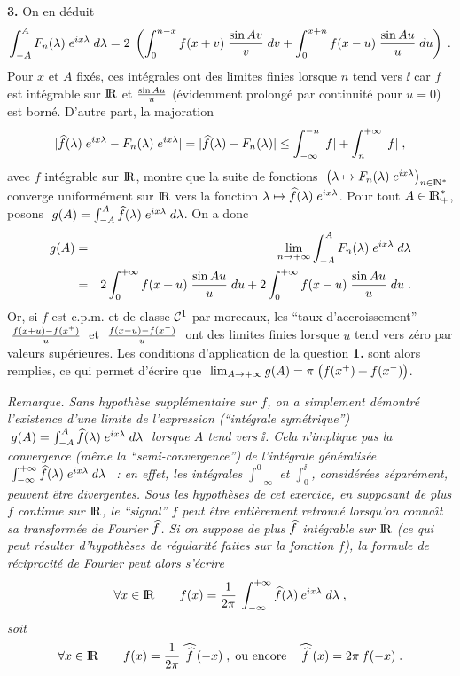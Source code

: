 \documentclass{article}
\begin{document}
\msk
{\bf 3.} On en d\'eduit\vv
$$\int_{-A}^AF_n(\lambda)\;e^{ix\lambda}\;d\lambda =
  2\;\left(\int_0^{n-x}f(x+v)\;{\sin Av\over v}\;dv
               + \int_0^{x+n}f(x-u)\;{\sin Au\over u}\; du\right)\;.$$
Pour $x$ et $A$ fix\'es, ces int\'egrales ont des limites finies lorsque $n$ tend vers $\ii$ car
$f$ est int\'egrable sur ${\rm I\kern-0.6mm R}$ et ${\sin Au\over u}$ (\'evidemment prolong\'e par
continuit\'e pour $u=0$) est born\'e.\psn
D'autre part, la majoration\vv
$$|\widehat{f}(\lambda)\;e^{ix\lambda}-F_n(\lambda)\;e^{ix\lambda}|=
  |\widehat{f}(\lambda)-F_n(\lambda)|\le\int_{-\infty}^{-n}|f|+\int_n^{+\infty}|f|\;,$$
avec $f$ int\'egrable sur ${\rm I\kern-0.6mm R}$,
montre que la suite de fonctions $\;\left(\lambda\mapsto F_n(\lambda)\;e^{ix\lambda}
\right)_{n\in{\rm I\kern-0.5mm N}^*}\;$ converge uniform\'ement sur ${\rm I\kern-0.6mm R}$ vers la fonction
$\lambda\mapsto\widehat{f}(\lambda)\;e^{ix\lambda}$.\pn
Pour tout $A\in{\rm I\kern-0.6mm R}_+^*$, posons $\;g(A)=\int_{-A}^A\widehat{f}(\lambda)\;e^{ix\lambda}
\;d\lambda$. On a donc\vv
\begin{eqnarray*}
g(A) & = & \lim_{n\rightarrow+\infty}\int_{-A}^AF_n(\lambda)\;e^{ix\lambda}\;d\lambda\\
                & = & 2\int_0^{+\infty}f(x+u)\;{\sin Au\over u}\;du+2\int_0^{+\infty}
                     f(x-u)\;  {\sin Au\over u}\;du\;.
\end{eqnarray*}
Or, si $f$ est c.p.m. et de classe ${\cal C}^1$ par morceaux, les ``taux
d'accroissement'' $\;{f(x+u)-f(x^+)\over u}\;$ et $\;{f(x-u)-f(x^-)\over u}\;$ ont
des limites finies lorsque $u$ tend vers z\'ero par valeurs sup\'erieures.
Les conditions d'application de la question {\bf 1.}
sont alors remplies, ce
qui permet d'\'ecrire que $\;\lim_{A\rightarrow+\infty}g(A)=\pi\;\big(f(x^+)+f(x^-)\big)$.

\msk\sect
{\it Remarque. Sans hypoth\`ese suppl\'ementaire sur $f$, on a simplement
d\'emontr\'e l'existence d'une limite de l'expression
(``int\'egrale sym\'etrique'')
$\;g(A)=\int_{-A}^A\widehat{f}(\lambda)\;e^{ix\lambda}\;d\lambda\;$
lorsque $A$ tend vers $\ii$. Cela
n'implique pas la convergence (m\^eme la ``semi-convergence'') de
l'int\'egrale g\'en\'eralis\'ee $\;\int_{-\infty}^{+\infty}\widehat{f}(\lambda)\;e^{ix\lambda}
\;d\lambda\;$~: en effet, les int\'egrales $\int_{-\infty}^0$ et
$\int_0^{\ii}$, consid\'er\'ees s\'epar\'ement, peuvent \^etre divergentes.\msk\sect
Sous les hypoth\`eses de cet exercice, en supposant
de plus $f$ continue sur ${\rm I\kern-0.6mm R}$, le ``signal''
$f$ peut \^etre enti\`erement retrouv\'e lorsqu'on conna\^\i t sa transform\'ee de
Fourier $\widehat{f}$. Si on suppose de plus $\widehat{f}$ int\'egrable sur ${\rm I\kern-0.6mm R}$
(ce qui peut r\'esulter d'hypoth\`eses de r\'egularit\'e faites sur la fonction $f$),
la formule de r\'eciprocit\'e de Fourier peut alors s'\'ecrire\vv
$$\forall x\in{\rm I\kern-0.6mm R}\qquad f(x)={1\over2\pi}\>\int_{-\infty}^{+\infty}\widehat{f}(\lambda)\>
  e^{ix\lambda}\;d\lambda\;,$$
soit\vv
$$\forall x\in{\rm I\kern-0.6mm R}\qquad f(x)={1\over2\pi}\>\widehat{\>\widehat{f}\;}(-x)\;,\;
  \hbox{ou encore}\quad \widehat{\>\widehat{f}\;}(x)=2\pi\>f(-x)\;.$$}
\end{document}
